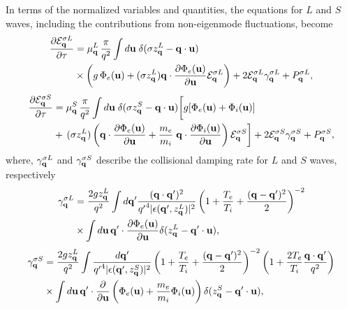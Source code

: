 \documentclass[12pt,a4paper,ruledheader]{report}
\def\calE{{\cal E}}
\begin{document}
In terms of the normalized variables and quantities, the equations
for $L$ and $S$ waves, including the contributions from non-eigenmode
fluctuations, become
\begin{equation}
  \begin{split}
    \frac{\partial\calE_{\bf q}^{\sigma L}}{\partial\tau}
  &=\mu_{\bf q}^L\,\frac{\pi}{q^2}\int d{\bf u}\;
    \delta(\sigma z_{\bf q}^L-{\bf q}\cdot{\bf u})\\
    &\times\biggl(g\,\Phi_e({\bf u})+(\sigma z_{\bf q}^L)
    {\bf q}\cdot\frac{\partial \Phi_e({\bf u})}{\partial{\bf u}}
    \calE_{\bf q}^{\sigma L}\biggr)
    +2\calE_{\bf q}^{\sigma L}\gamma_{\bf q}^{\sigma L}+P_{\bf q}^{\sigma L},
      \end{split}
 \label{EpsL}
\end{equation}
\begin{equation}
  \begin{split}
    \frac{\partial{\cal E}_{\bf q}^{\sigma S}}{\partial \tau}
  &=\mu_{\bf q}^S\,\frac{\pi}{q^2}
    \int d{\bf u}\;
    \delta(\sigma z_{\bf q}^S-{\bf q}\cdot{\bf u})
    \biggl[g[\Phi_e({\bf u})+\Phi_i({\bf u})]\\
    &+\,(\sigma z_{\bf q}^L)\,\biggl({\bf q}\cdot
    \frac{\partial \Phi_e({\bf u})}{\partial{\bf u}}
    +\frac{m_e}{m_i}\;{\bf q}\cdot
    \frac{\partial \Phi_i({\bf u})}{\partial{\bf u}}\biggr)
    \,\calE_{\bf q}^{\sigma S}\biggr]
    +2\calE_{\bf q}^{\sigma S}\gamma_{\bf q}^{\sigma S}+P_{\bf q}^{\sigma S},
\end{split}
 \label{EpsS}
\end{equation}
where, $\gamma_{\bf q}^{\sigma L}$ and $\gamma_{\bf q}^{\sigma S}$ describe
the collisional damping rate for $L$ and $S$ waves, respectively
\begin{equation}
  \label{GqL}
  \begin{split}
    \gamma_{\bf q}^{\sigma L}&=
    \frac{2gz_{\bf q}^L}{q^2}\int d{\bf q}'
    \frac{({\bf q}\cdot {\bf q'})^2}{{q'}^4
    |\epsilon({\bf q'},z_{\bf q}^L)|^2}
    \left(1+\frac{T_e}{T_i}
    +\frac{({\bf q}-{\bf q'})^2}{2}\right)^{-2}\\
  &\times\int d{\bf u}\,{\bf q'}\cdot
    \frac{\partial \Phi_e({\bf u})}{\partial {\bf u}}
    \delta(z_{\bf q}^L-{\bf q'}\cdot{\bf u}),
  \end{split}
\end{equation}
\begin{equation}
  \label{GqS}
  \begin{split}
    \gamma_{\bf q}^{\sigma S}
    &=\frac{2gz_{\bf q}^L}{q^2}
    \int\frac{d{\bf q}'}{{q'}^4|\epsilon({\bf q'},z_{\bf q}^S)|^2}
    \left(1+\frac{T_e}{T_i}+\frac{({\bf q}-{\bf q'})^2}{2}\right)^{-2}
    \left(1+\frac{2T_e}{T_i}\frac{{\bf q}\cdot{\bf q}'}{q^2}\right)\\
  &\times \int d{\bf u}\, {\bf q'}
    \cdot\frac{\partial}{\partial {\bf u}}
    \left(\Phi_e({\bf u})+\frac{m_e}{m_i}
    \Phi_i({\bf u})\right)\delta(z_{\bf q}^S
    -{\bf q'}\cdot{\bf u}),
  \end{split}
\end{equation}
\end{document}
